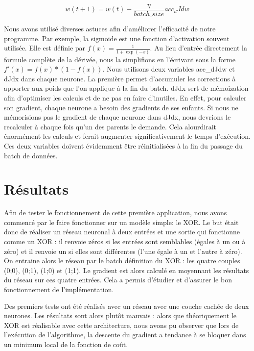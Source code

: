 \documentclass{report}
\begin{document}
\begin{equation}
w(t+1) = w(t) - \frac{\eta}{batch\_size}acc_dJdw
\label{mise_a_jour_poids_batch}
\end{equation}

Nous avons utilisé diverses astuces afin d'améliorer l'efficacité de notre programme. Par exemple, la sigmoide est une fonction d'activation souvent utilisée. Elle est définie par $f(x) = \frac{1}{1+\exp(-x)}$. Au lieu d'entrée directement la formule complète de la dérivée, nous la simplifions en l'écrivant sous la forme $f'(x) = f(x) * (1 - f(x))$.
Nous utilisons deux variables acc\_dJdw et dJdx dans chaque neurone. La première permet d'accumuler les corrections à apporter aux poids que l'on applique à la fin du batch. dJdx sert de mémoization afin d'optimiser les calculs et de ne pas en faire d'inutiles. En effet, pour calculer son gradient, chaque neurone a besoin des gradients de ses enfants. Si nous ne mémorisions pas le gradient de chaque neurone dans dJdx, nous devrions le recalculer à chaque fois qu'un des parents le demande. Cela alourdirait énormément les calculs et ferait augmenter significativement le temps d'exécution. Ces deux variables doivent évidemment être réinitialisées à la fin du passage du batch de données.

\section{Résultats}

Afin de tester le fonctionnement de cette première application, nous avons commencé par le faire fonctionner sur un modèle simple: le XOR. Le but était donc de réaliser un réseau neuronal à deux entrées et une sortie qui fonctionne comme un XOR : il renvoie zéros si les entrées sont semblables (égales à un ou à zéro) et il renvoie un si elles sont différentes (l'une égale à un et l'autre à zéro). On entraine alors le réseau par le batch définition du XOR : les quatre couples (0;0), (0;1), (1;0) et (1;1). Le gradient est alors calculé en moyennant les résultats du réseau sur ces quatre entrées.
Cela a permis d'étudier et d'assurer le bon fonctionnement de l'implémentation.

Des premiers tests ont été réalisés avec un réseau avec une couche cachée de deux neurones. Les résultats sont alors plutôt mauvais : alors que théoriquement le XOR est réalisable avec cette architecture, nous avons pu observer que lors de l'exécution de l'algorithme, la descente du gradient a tendance à se bloquer dans un minimum local de la fonction de coût. 
\end{document}
